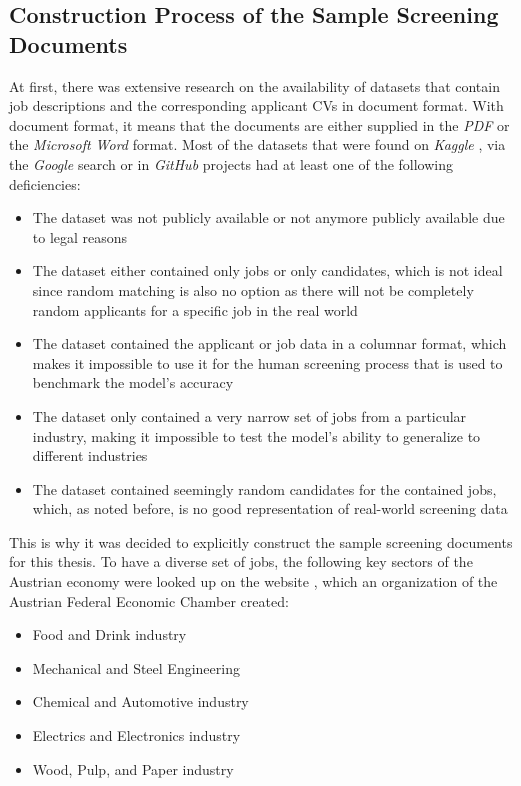 \documentclass[draft,final]{thesisclass} %
\begin{document}
\subsection{Construction Process of the Sample Screening Documents} \label{construction_process_of_the_sample_screening_documents}
At first, there was extensive research on the availability of datasets that contain job descriptions and the corresponding applicant \acs{CV}s in document format.
With document format, it means that the documents are either supplied in the \textit{PDF} or the \textit{Microsoft Word} format.
Most of the datasets that were found on \textit{Kaggle} \parencite{kaggle}, via the \textit{Google} search or in \textit{GitHub} projects had at least one of the following deficiencies:
\begin{itemize}
    \item The dataset was not publicly available or not anymore publicly available due to legal reasons
    \item The dataset either contained only jobs or only candidates, which is not ideal since random matching is also no option as there will not be completely random applicants for a specific job in the real world
    \item The dataset contained the applicant or job data in a columnar format, which makes it impossible to use it for the human screening process that is used to benchmark the model's accuracy
    \item The dataset only contained a very narrow set of jobs from a particular industry, making it impossible to test the model's ability to generalize to different industries
    \item The dataset contained seemingly random candidates for the contained jobs, which, as noted before, is no good representation of real-world screening data
\end{itemize}
This is why it was decided to explicitly construct the sample screening documents for this thesis.
To have a diverse set of jobs, the following key sectors of the Austrian economy were looked up on the website \parencite{austria_key_sectors}, which an organization of the Austrian Federal Economic Chamber created:
\begin{itemize}
    \item Food and Drink industry
    \item Mechanical and Steel Engineering
    \item Chemical and Automotive industry
    \item Electrics and Electronics industry
    \item Wood, Pulp, and Paper industry
\end{itemize}
\end{document}
